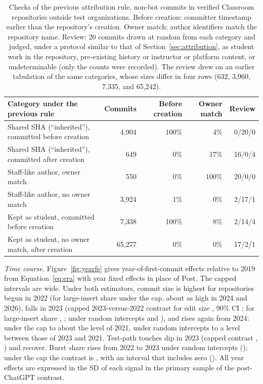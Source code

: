 \documentclass[acmsmall,screen,review,anonymous]{acmart}
\begin{document}
\begin{table}[!htbp]
\caption{Checks of the previous attribution rule, non-bot commits in verified Classroom repositories outside test organizations. Before creation: committer timestamp earlier than the repository's creation. Owner match: author identifiers match the repository name. Review: 20 commits drawn at random from each category and judged, under a protocol similar to that of Section~\ref{sec:attribution}, as student work in the repository, pre-existing history or instructor or platform content, or undeterminable (only the counts were recorded). The review drew on an earlier tabulation of the same categories, whose sizes differ in four rows (632, 3,960, 7,335, and 65,242).}
\label{tab:activity}
\footnotesize
\setlength{\tabcolsep}{4pt}
\begin{tabular}{@{}p{5.6cm} r r r r@{}}
\toprule
Category under the previous rule & Commits & Before creation & Owner match & Review \\
\midrule
Shared SHA (``inherited''), committed before creation & 4,904 & 100\% & 4\% & 0/20/0 \\
Shared SHA (``inherited''), committed after creation & 649 & 0\% & 17\% & 16/0/4 \\
Staff-like author, owner match & 550 & 0\% & 100\% & 20/0/0 \\
Staff-like author, no owner match & 3,924 & 1\% & 0\% & 2/17/1 \\
Kept as student, committed before creation & 7,338 & 100\% & 8\% & 2/14/4 \\
Kept as student, no owner match, after creation & 65,277 & 0\% & 0\% & 17/2/1 \\
\bottomrule
\end{tabular}
\end{table}









\textit{Time course.} Figure~\ref{fig:yearfe} gives year-of-first-commit effects relative to 2019 from Equation~\ref{eq:era} with year fixed effects in place of $\mathrm{Post}$. The capped intervals are wide. Under both estimators, commit size is highest for repositories begun in 2022 (for large-insert share under the cap, about as high in 2024 and 2026), falls in 2023 (capped 2023-versus-2022 contrast for edit size , 90\% CI ; for large-insert share , ; under random intercepts  and ), and rises again from 2024: under the cap to about the level of 2021, under random intercepts to a level between those of 2023 and 2021. Test-path touches dip in 2023 (capped contrast , ) and recover. Burst share rises from 2022 to 2023 under random intercepts (); under the cap the contrast is , with an interval that includes zero (). All year effects are expressed in the SD of each signal in the primary sample of the post-ChatGPT contrast.
\end{document}
